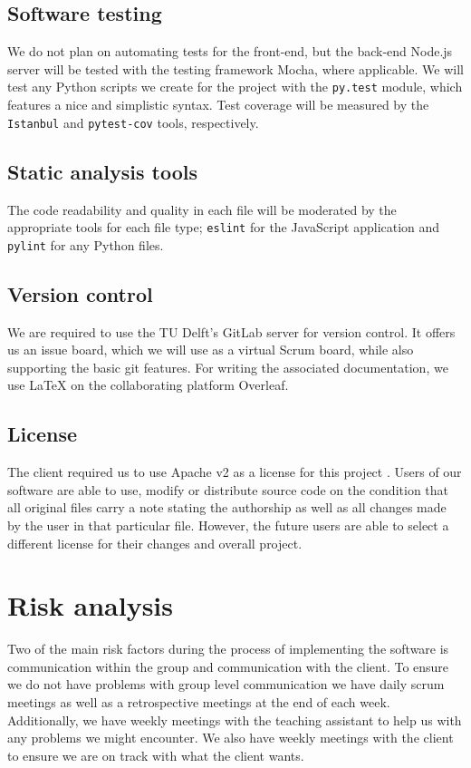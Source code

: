 \documentclass{report}
\begin{document}
\subsection{Software testing}
We do not plan on automating tests for the front-end, but the back-end Node.js server will be tested with the testing framework Mocha, where applicable. We will test any Python scripts we create for the project with the \texttt{py.test} module, which features a nice and simplistic syntax. Test coverage will be measured by the \texttt{Istanbul} and \texttt{pytest-cov} tools, respectively.


\subsection{Static analysis tools}
The code readability and quality in each file will be moderated by the appropriate tools for each file type; \texttt{eslint} for the JavaScript application and \texttt{pylint} for any Python files.


\subsection{Version control}
We are required to use the TU Delft's GitLab server for version control. It offers us an issue board, which we will use as a virtual Scrum board, while also supporting the basic git features. For writing the associated documentation, we use \LaTeX{} on the collaborating platform Overleaf.


\subsection{License}
The client required us to use Apache v2 as a license for this project \cite{apachev2}. Users of our software are able to use, modify or distribute source code on the condition that all original files carry a note stating the authorship as well as all changes made by the user in that particular file. However, the future users are able to select a different license for their changes and overall project.


\section {Risk analysis}
Two of the main risk factors during the process of implementing the software is communication within the group and communication with the client. To ensure we do not have problems with group level communication we have daily scrum meetings as well as a retrospective meetings at the end of each week. Additionally, we have weekly meetings with the teaching assistant to help us with any problems we might encounter. We also have weekly meetings with the client to ensure we are on track with what the client wants.
\end{document}
